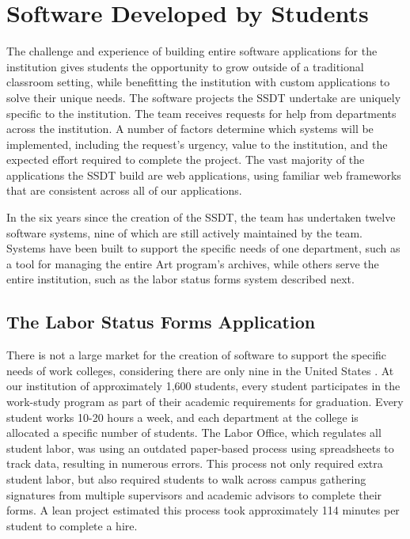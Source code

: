 \section{Software Developed by Students}

The challenge and experience of building entire software applications for the institution gives students the opportunity to grow outside of a traditional classroom setting, while benefitting the institution with custom applications to solve their unique needs. The software projects the SSDT undertake are uniquely specific to the institution. The team receives requests for help from departments across the institution. A number of factors determine which systems will be implemented, including the request’s urgency, value to the institution, and the expected effort required to complete the project. The vast majority of the applications the SSDT build are web applications, using familiar web frameworks that are consistent across all of our applications.

In the six years since the creation of the SSDT, the team has undertaken twelve software systems, nine of which are still actively maintained by the team. Systems have been built to support the specific needs of one department, such as a tool for managing the entire Art program's archives, while others serve the entire institution, such as the labor status forms system described next.

\subsection{The Labor Status Forms Application}\label{sec:software}
There is not a large market for the creation of software to support the specific needs of work colleges, considering there are only nine in the United States \cite{WCCMembers, Ecclesia}. At our institution of approximately 1,600 students, every student participates in the work-study program as part of their academic requirements for graduation. Every student works 10-20 hours a week, and each department at the college is allocated a specific number of students. The Labor Office, which regulates all student labor, was using an outdated paper-based process using spreadsheets to track data, resulting in numerous errors. This process not only required extra student labor, but also required students to walk across campus gathering signatures from multiple supervisors and academic advisors to complete their forms. A lean project estimated this process took approximately 114 minutes per student to complete a hire.


